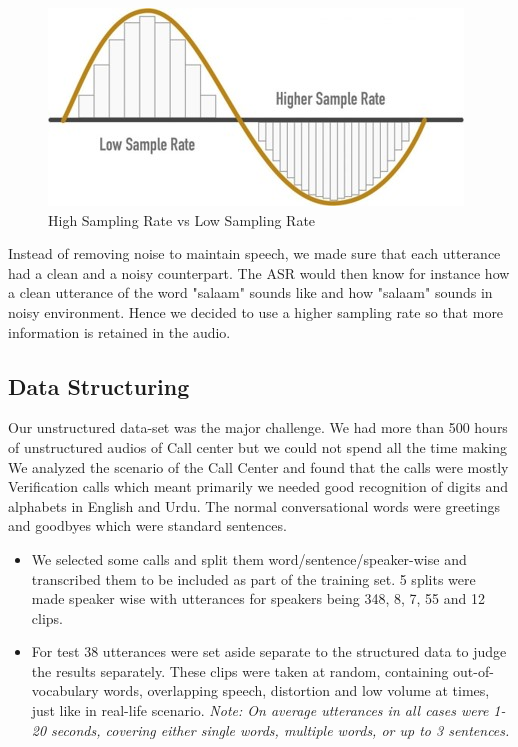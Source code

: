 \begin{figure}[htb]
    \centering
    \includegraphics[scale=0.8]{img/samplingrate.jpg}
    \caption{High Sampling Rate vs Low Sampling Rate}
    \label{fig:sampling-rate-high-low}
\end{figure}

Instead of removing noise to maintain speech, we made sure that each utterance had a clean and a noisy counterpart. The ASR would then know for instance how a clean utterance of the word "salaam" sounds like and how "salaam" sounds in noisy environment. Hence we decided to use a higher sampling rate so that more information is retained in the audio. 

\subsection{Data Structuring}
Our unstructured data-set was the major challenge. We had more than 500 hours of unstructured audios of Call center but we could not spend all the time making We analyzed the scenario of the Call Center and found that the calls were mostly Verification calls which meant primarily we needed good recognition of digits and alphabets in English and Urdu. The normal conversational words were greetings and goodbyes which were standard sentences.

\begin{itemize}
    \item We selected some calls and split them word/sentence/speaker-wise and transcribed them to be included as part of the training set. 5 splits were made speaker wise with utterances for speakers being 348, 8, 7, 55 and 12 clips.
    \item For test 38 utterances were set aside separate to the structured data to judge the results separately. These clips were taken at random, containing out-of-vocabulary words, overlapping speech, distortion and low volume at times, just like in real-life scenario.
    \textit{Note: On average utterances in all cases were 1-20 seconds, covering either single words, multiple words, or up to 3 sentences.} 
\end{itemize}

